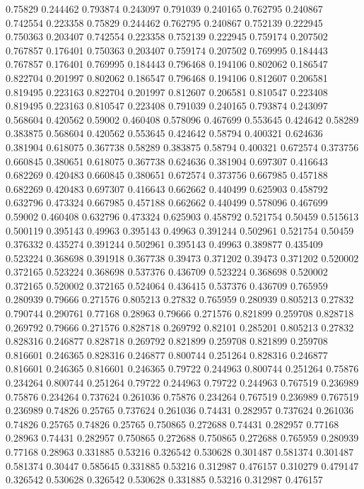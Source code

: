 0.75829 0.244462
0.793874 0.243097
0.791039 0.240165
0.762795 0.240867
0.742554 0.223358
0.75829 0.244462
0.762795 0.240867
0.752139 0.222945
0.750363 0.203407
0.742554 0.223358
0.752139 0.222945
0.759174 0.207502
0.767857 0.176401
0.750363 0.203407
0.759174 0.207502
0.769995 0.184443
0.767857 0.176401
0.769995 0.184443
0.796468 0.194106
0.802062 0.186547
0.822704 0.201997
0.802062 0.186547
0.796468 0.194106
0.812607 0.206581
0.819495 0.223163
0.822704 0.201997
0.812607 0.206581
0.810547 0.223408
0.819495 0.223163
0.810547 0.223408
0.791039 0.240165
0.793874 0.243097
0.568604 0.420562
0.59002 0.460408
0.578096 0.467699
0.553645 0.424642
0.58289 0.383875
0.568604 0.420562
0.553645 0.424642
0.58794 0.400321
0.624636 0.381904
0.618075 0.367738
0.58289 0.383875
0.58794 0.400321
0.672574 0.373756
0.660845 0.380651
0.618075 0.367738
0.624636 0.381904
0.697307 0.416643
0.682269 0.420483
0.660845 0.380651
0.672574 0.373756
0.667985 0.457188
0.682269 0.420483
0.697307 0.416643
0.662662 0.440499
0.625903 0.458792
0.632796 0.473324
0.667985 0.457188
0.662662 0.440499
0.578096 0.467699
0.59002 0.460408
0.632796 0.473324
0.625903 0.458792
0.521754 0.50459
0.515613 0.500119
0.395143 0.49963
0.395143 0.49963
0.391244 0.502961
0.521754 0.50459
0.376332 0.435274
0.391244 0.502961
0.395143 0.49963
0.389877 0.435409
0.523224 0.368698
0.391918 0.367738
0.39473 0.371202
0.39473 0.371202
0.520002 0.372165
0.523224 0.368698
0.537376 0.436709
0.523224 0.368698
0.520002 0.372165
0.520002 0.372165
0.524064 0.436415
0.537376 0.436709
0.765959 0.280939
0.79666 0.271576
0.805213 0.27832
0.765959 0.280939
0.805213 0.27832
0.790744 0.290761
0.77168 0.28963
0.79666 0.271576
0.821899 0.259708
0.828718 0.269792
0.79666 0.271576
0.828718 0.269792
0.82101 0.285201
0.805213 0.27832
0.828316 0.246877
0.828718 0.269792
0.821899 0.259708
0.821899 0.259708
0.816601 0.246365
0.828316 0.246877
0.800744 0.251264
0.828316 0.246877
0.816601 0.246365
0.816601 0.246365
0.79722 0.244963
0.800744 0.251264
0.75876 0.234264
0.800744 0.251264
0.79722 0.244963
0.79722 0.244963
0.767519 0.236989
0.75876 0.234264
0.737624 0.261036
0.75876 0.234264
0.767519 0.236989
0.767519 0.236989
0.74826 0.25765
0.737624 0.261036
0.74431 0.282957
0.737624 0.261036
0.74826 0.25765
0.74826 0.25765
0.750865 0.272688
0.74431 0.282957
0.77168 0.28963
0.74431 0.282957
0.750865 0.272688
0.750865 0.272688
0.765959 0.280939
0.77168 0.28963
0.331885 0.53216
0.326542 0.530628
0.301487 0.581374
0.301487 0.581374
0.30447 0.585645
0.331885 0.53216
0.312987 0.476157
0.310279 0.479147
0.326542 0.530628
0.326542 0.530628
0.331885 0.53216
0.312987 0.476157
